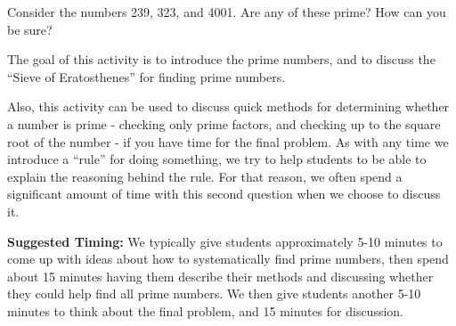 \documentclass{ximera}
\begin{document}
\begin{problem}
Consider the numbers 239, 323, and 4001. Are any of these prime? How
can you be sure?
\end{problem}


\newpage
\begin{instructorNotes}
The goal of this activity is to introduce the prime numbers, and to discuss the ``Sieve of Eratosthenes'' for finding prime numbers.

Also, this activity can be used to discuss quick methods for determining whether a number is prime - checking only prime factors, and checking up to the square root of the number - if you have time for the final problem. As with any time we introduce a ``rule'' for doing something, we try to help students to be able to explain the reasoning behind the rule.  For that reason, we often spend a significant amount of time with this second question when we choose to discuss it.

{\bf Suggested Timing:} We typically give students approximately 5-10 minutes to come up with ideas about how to systematically find prime numbers, then spend about 15 minutes having them describe their methods and discussing whether they could help find all prime numbers.  We then give students another 5-10 minutes to think about the final problem, and 15 minutes for discussion.
\end{instructorNotes}
\end{document}

